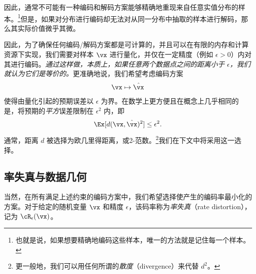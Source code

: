 \documentclass[../../book-main_zh.tex]{subfiles}
\begin{document}
因此，通常不可能有一种编码和解码方案能够精确地重现来自任意实值分布的样本。\footnote{也就是说，如果想要精确地编码这些样本，唯一的方法就是记住每一个样本。}但是，如果对分布进行编码却无法对从同一分布中抽取的样本进行解码，那么其实际价值微乎其微。

因此，为了确保任何编码/解码方案都是可计算的，并且可以在有限的内存和计算资源下实现，我们需要对样本 $\vx$ 进行量化，并仅在一定精度（例如 $\epsilon > 0$）内对其进行编码。{\em 通过这样做，本质上，如果任意两个数据点之间的距离小于 $\epsilon$，我们就认为它们是等价的。}更准确地说，我们希望考虑编码方案
\begin{equation}
    \vx \mapsto \hat \vx
\end{equation}
使得由量化引起的预期误差以 $\epsilon$ 为界。在数学上更方便且在概念上几乎相同的是，将预期的\textit{平方}误差限制在 \(\epsilon^{2}\) 内，即
\begin{equation}
    \Ex[d(\vx, \hat \vx)^{2}] \le \epsilon^{2}.
\end{equation}
通常，距离 \(d\) 被选择为欧几里得距离，或2-范数。\footnote{更一般地，我们可以用任何所谓的\textit{散度}（divergence）来代替 \(d^{2}\)。}我们在下文中将采用这一选择。

\subsection{率失真与数据几何}
当然，在所有满足上述约束的编码方案中，我们希望选择使产生的编码率最小化的方案。对于给定的随机变量 $\vx$ 和精度 $\epsilon$，该码率称为\textit{率失真}（rate distortion），记为 $\cR_{\epsilon}(\vx)$。
\end{document}
